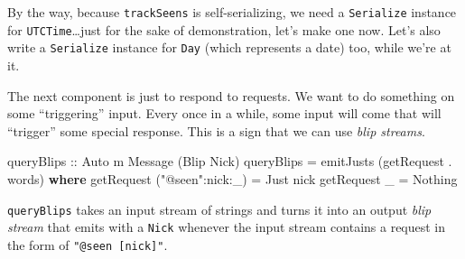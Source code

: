 \documentclass[]{article}
\newenvironment{Shaded}{}{}
\newcommand{\CommentTok}[1]{\textcolor[rgb]{0.38,0.63,0.69}{\textit{#1}}}
\newcommand{\DataTypeTok}[1]{\textcolor[rgb]{0.56,0.13,0.00}{#1}}
\newcommand{\FunctionTok}[1]{\textcolor[rgb]{0.02,0.16,0.49}{#1}}
\newcommand{\KeywordTok}[1]{\textcolor[rgb]{0.00,0.44,0.13}{\textbf{#1}}}
\newcommand{\NormalTok}[1]{#1}
\newcommand{\OperatorTok}[1]{\textcolor[rgb]{0.40,0.40,0.40}{#1}}
\newcommand{\OtherTok}[1]{\textcolor[rgb]{0.00,0.44,0.13}{#1}}
\newcommand{\StringTok}[1]{\textcolor[rgb]{0.25,0.44,0.63}{#1}}
\begin{document}
By the way, because \texttt{trackSeens} is self-serializing, we need a
\texttt{Serialize} instance for \texttt{UTCTime}\ldots just for the sake of
demonstration, let's make one now. Let's also write a \texttt{Serialize}
instance for \texttt{Day} (which represents a date) too, while we're at it.

\begin{Shaded}
\end{Shaded}

The next component is just to respond to requests. We want to do something on
some ``triggering'' input. Every once in a while, some input will come that will
``trigger'' some special response. This is a sign that we can use \emph{blip
streams}.

\begin{Shaded}
\begin{Highlighting}[]
\OtherTok{queryBlips ::} \DataTypeTok{Auto}\NormalTok{ m }\DataTypeTok{Message}\NormalTok{ (}\DataTypeTok{Blip} \DataTypeTok{Nick}\NormalTok{)}
\NormalTok{queryBlips }\OtherTok{=}\NormalTok{ emitJusts (getRequest }\OperatorTok{.} \FunctionTok{words}\NormalTok{)}
  \KeywordTok{where}
\NormalTok{    getRequest (}\StringTok{"@seen"}\OperatorTok{:}\NormalTok{nick}\OperatorTok{:}\NormalTok{\_) }\OtherTok{=} \DataTypeTok{Just}\NormalTok{ nick}
\NormalTok{    getRequest \_                }\OtherTok{=} \DataTypeTok{Nothing}
\end{Highlighting}
\end{Shaded}

\texttt{queryBlips} takes an input stream of strings and turns it into an output
\emph{blip stream} that emits with a \texttt{Nick} whenever the input stream
contains a request in the form of \texttt{"@seen\ {[}nick{]}"}.
\end{document}
